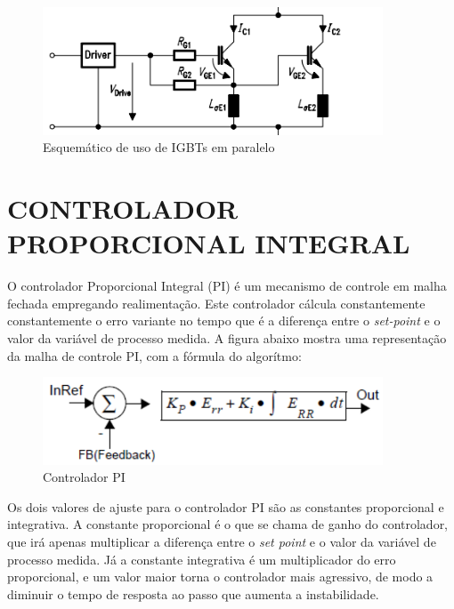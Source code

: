 \begin{figure}[!htb]
    \centering
    \includegraphics[width=0.9\textwidth]{./dados/figuras/paralleligbt}
    \caption{Esquemático de uso de IGBTs em paralelo}
    \label{fig:figura-paralleligbt}
\end{figure}

\section{CONTROLADOR PROPORCIONAL INTEGRAL}
\label{sec:pi-controller}
O controlador Proporcional Integral (PI) é um mecanismo de controle em malha fechada empregando realimentação. Este controlador cálcula constantemente constantemente o erro variante no tempo que é a diferença entre o \textit{set-point} e o valor da variável de processo medida. A figura abaixo mostra uma representação da malha de controle PI, com a fórmula do algorítmo:

\begin{figure}[H]
    \centering
    \includegraphics[width=0.9\textwidth]{./dados/figuras/pi-controller}
    \caption{Controlador PI}
    \label{fig:figura-pi-controller}
\end{figure}

Os dois valores de ajuste para o controlador PI são as constantes proporcional e integrativa. A constante proporcional é o que se chama de ganho do controlador, que irá apenas multiplicar a diferença entre o \textit{set point} e o valor da variável de processo medida. Já a constante integrativa é um multiplicador do erro proporcional, e um valor maior torna o controlador mais agressivo, de modo a diminuir o tempo de resposta ao passo que aumenta a instabilidade.


